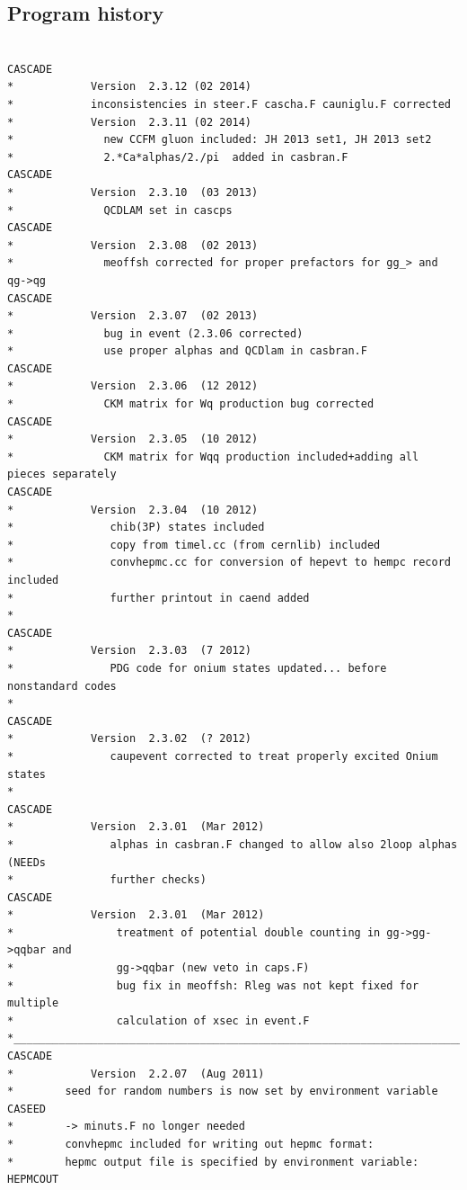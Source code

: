 \documentclass[11pt]{article} \usepackage{mystyle-new}
\begin{document}
\subsection{Program history}
\begin{tiny}

\begin{verbatim}

CASCADE 
*            Version  2.3.12 (02 2014)
*            inconsistencies in steer.F cascha.F cauniglu.F corrected
*            Version  2.3.11 (02 2014)
*              new CCFM gluon included: JH 2013 set1, JH 2013 set2
*              2.*Ca*alphas/2./pi  added in casbran.F
CASCADE 
*            Version  2.3.10  (03 2013)
*              QCDLAM set in cascps
CASCADE 
*            Version  2.3.08  (02 2013)
*              meoffsh corrected for proper prefactors for gg_> and qg->qg
CASCADE 
*            Version  2.3.07  (02 2013)
*              bug in event (2.3.06 corrected)
*              use proper alphas and QCDlam in casbran.F
CASCADE 
*            Version  2.3.06  (12 2012)
*              CKM matrix for Wq production bug corrected
CASCADE 
*            Version  2.3.05  (10 2012)
*              CKM matrix for Wqq production included+adding all pieces separately
CASCADE 
*            Version  2.3.04  (10 2012)
*               chib(3P) states included
*               copy from timel.cc (from cernlib) included
*               convhepmc.cc for conversion of hepevt to hempc record included 
*               further printout in caend added
*
CASCADE 
*            Version  2.3.03  (7 2012)
*               PDG code for onium states updated... before nonstandard codes
*
CASCADE 
*            Version  2.3.02  (? 2012)
*               caupevent corrected to treat properly excited Onium states
*
CASCADE 
*            Version  2.3.01  (Mar 2012)
*               alphas in casbran.F changed to allow also 2loop alphas (NEEDs
*               further checks)
CASCADE 
*            Version  2.3.01  (Mar 2012)
*                treatment of potential double counting in gg->gg->qqbar and
*                gg->qqbar (new veto in caps.F)
*                bug fix in meoffsh: Rleg was not kept fixed for multiple
*                calculation of xsec in event.F
*________________________________________________________________________
CASCADE 
*            Version  2.2.07  (Aug 2011)
* 		 seed for random numbers is now set by environment variable CASEED
* 		 -> minuts.F no longer needed
* 		 convhepmc included for writing out hepmc format: 
*		 hepmc output file is specified by environment variable: HEPMCOUT

\end{verbatim}
\end{tiny}
\end{document}
